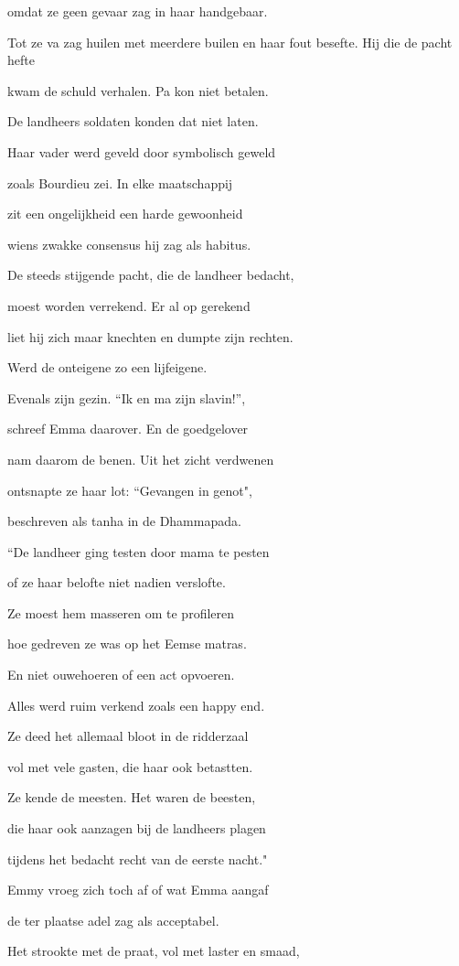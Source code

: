 omdat ze geen gevaar
zag in haar handgebaar.

Tot ze va zag huilen
met meerdere builen
en haar fout besefte.
Hij die de pacht hefte

kwam de schuld verhalen.
Pa kon niet betalen.

De landheers soldaten
konden dat niet laten.

Haar vader werd geveld
door symbolisch geweld

zoals Bourdieu zei.
In elke maatschappij

zit een ongelijkheid
een harde gewoonheid

wiens zwakke consensus
hij zag als habitus.

De steeds stijgende pacht,
die de landheer bedacht,

moest worden verrekend.
Er al op gerekend

liet hij zich maar knechten
en dumpte zijn rechten.

Werd de onteigene
zo een lijfeigene.

Evenals zijn gezin.
“Ik en ma zijn slavin!”,

schreef Emma daarover.
En de goedgelover

nam daarom de benen.
Uit het zicht verdwenen

ontsnapte ze haar lot:
“Gevangen in genot",

beschreven als tanha
in de Dhammapada.

“De landheer ging testen
door mama te pesten

of ze haar belofte
niet nadien verslofte.

Ze moest hem masseren
om te profileren

hoe gedreven ze was
op het Eemse matras.

En niet ouwehoeren
of een act opvoeren.

Alles werd ruim verkend
zoals een happy end.

Ze deed het allemaal
bloot in de ridderzaal

vol met vele gasten,
die haar ook betastten.

Ze kende de meesten.
Het waren de beesten,

die haar ook aanzagen
bij de landheers plagen

tijdens het bedacht
recht van de eerste nacht."

Emmy vroeg zich toch af
of wat Emma aangaf

de ter plaatse adel
zag als acceptabel.

Het strookte met de praat,
vol met laster en smaad,

